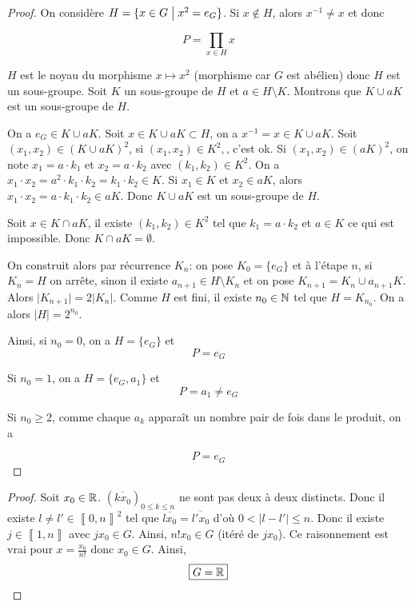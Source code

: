 \documentclass[12pt]{article}
\begin{document}
\begin{proof}
	On considère $H=\{x\in G\bigm| x^{2}=e_{G}\}$. Si $x\notin H$, alors $x^{-1}\neq x$ et donc 
	
	\begin{equation}
		P=\prod_{x\in H}x	
	\end{equation}
	
	$H$ est le noyau du morphisme $x\mapsto x^{2}$ (morphisme car $G$ est abélien) donc $H$ est un sous-groupe. Soit $K$ un sous-groupe de $H$ et $a\in H\setminus K$. Montrons que $K\cup aK$ est un sous-groupe de $H$.
	
	On a $e_{G}\in K\cup aK$. Soit $x\in K\cup aK\subset H$, on a $x^{-1}=x\in K\cup aK$. Soit $(x_{1},x_{2})\in (K\cup aK)^{2}$, si $(x_{1},x_{2})\in K^{2},$, c'est ok. Si $(x_{1},x_{2})\in (aK)^{2}$, on note $x_{1}=a\cdot k_{1}$ et $x_{2}=a\cdot k_{2}$ avec $(k_{1},k_{2})\in K^{2}$. On a $x_{1}\cdot x_{2}=a^{2}\cdot k_{1}\cdot k_{2}=k_{1}\cdot k_{2}\in K$. Si $x_{1}\in K$ et $x_{2}\in aK$, alors $x_{1}\cdot x_{2}=a\cdot k_{1}\cdot k_{2}\in aK$. Donc $K\cup aK$ est un sous-groupe de $H$.

	Soit $x\in K\cap aK$, il existe $(k_{1},k_{2})\in K^{2}$ tel que $k_{1}=a\cdot k_{2}$ et $a\in K$ ce qui est impossible. Donc $K\cap aK=\emptyset$.

	On construit alors par récurrence $K_{n}$: on pose $K_{0}=\{e_{G}\}$ et à l'étape $n$, si $K_{n}=H$ on arrête, sinon il existe $a_{n+1}\in H\setminus K_{n}$ et on pose $K_{n+1}=K_{n}\cup a_{n+1}K$. Alors $\vert K_{n+1}\vert=2\vert K_{n}\vert$. Comme $H$ est fini, il existe $n_{0}\in\mathbb{N}$ tel que $H=K_{n_{0}}$. On a alors $\vert H\vert=2^{n_{0}}$.

	Ainsi, si $n_{0}=0$, on a $H=\{e_{G}\}$ et 
	\begin{equation}
		\boxed{P=e_{G}}
	\end{equation}
	
	Si $n_{0}=1$, on a $H=\{e_{G},a_{1}\}$ et 
	\begin{equation}
		\boxed{P=a_{1}\neq e_{G}}
	\end{equation}
	
	Si $n_{0}\geqslant 2$, comme chaque $a_{k}$ apparaît un nombre pair de fois dans le produit, on a 
	
	\begin{equation}
		\boxed{P=e_{G}}
	\end{equation}
\end{proof}

\begin{proof}
	Soit $x_{0}\in\mathbb{R}$. $(\overline{kx_{0}})_{0\leqslant k\leqslant n}$ ne sont pas deux à deux distincts. Donc il existe $l\neq l'\in\left\llbracket 0,n\right\rrbracket^{2}$ tel que $\overline{lx_{0}}=\overline{l'x_{0}}$ d'où $0<\vert l-l'\vert\leqslant n$. Donc il existe $j\in\left\llbracket 1, n\right\rrbracket$ avec $jx_{0}\in G$. Ainsi, $n!x_{0}\in G$ (itéré de $jx_{0}$). Ce raisonnement est vrai pour $x=\frac{x_{0}}{n!}$ donc $x_{0}\in G$. Ainsi, 
	\begin{equation}
		\boxed{G=\mathbb{R}}
	\end{equation}
\end{proof}
\end{document}
